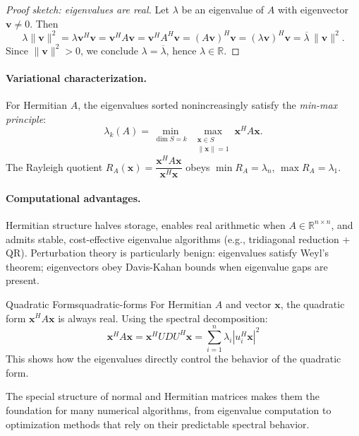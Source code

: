 \documentclass[../../main.tex]{subfiles}
\begin{document}
\begin{proof}[Proof sketch: eigenvalues are real]
    Let $\lambda$ be an eigenvalue of $A$ with eigenvector $\mathbf{v} \neq 0$. Then
    \[
        \lambda \|\mathbf{v}\|^2
        = \lambda \mathbf{v}^H \mathbf{v}
        = \mathbf{v}^H A \mathbf{v}
        = \mathbf{v}^H A^H \mathbf{v}
        = (A\mathbf{v})^H \mathbf{v}
        = (\lambda \mathbf{v})^H \mathbf{v}
        = \overline{\lambda}\, \|\mathbf{v}\|^2.
    \]
    Since $\|\mathbf{v}\|^2 > 0$, we conclude $\lambda = \overline{\lambda}$, hence $\lambda \in \mathbb{R}$.
\end{proof}

\paragraph{Variational characterization.}
For Hermitian $A$, the eigenvalues sorted nonincreasingly satisfy the \emph{min-max principle}:
\[
    \lambda_k(A)=\min_{\dim S=k}\ \max_{\substack{\mathbf{x}\in S\\ \|\mathbf{x}\|=1}} \mathbf{x}^H A \mathbf{x}.
\]
The Rayleigh quotient $R_A(\mathbf{x})=\dfrac{\mathbf{x}^H A \mathbf{x}}{\mathbf{x}^H \mathbf{x}}$ obeys $\min R_A=\lambda_n$, $\max R_A=\lambda_1$.

\paragraph{Computational advantages.}
Hermitian structure halves storage, enables real arithmetic when $A\in\mathbb{R}^{n\times n}$, and admits stable, cost-effective eigenvalue algorithms (e.g., tridiagonal reduction + QR). Perturbation theory is particularly benign: eigenvalues satisfy Weyl's theorem; eigenvectors obey Davis-Kahan bounds when eigenvalue gaps are present.

\begin{example}{Quadratic Forms}{quadratic-forms}
    For Hermitian $A$ and vector $\mathbf{x}$, the quadratic form $\mathbf{x}^H A \mathbf{x}$ is always real. Using the spectral decomposition:
    \[
        \mathbf{x}^H A \mathbf{x} = \mathbf{x}^H U D U^H \mathbf{x} = \sum_{i=1}^n \lambda_i |u_i^H \mathbf{x}|^2
    \]
    This shows how the eigenvalues directly control the behavior of the quadratic form.
\end{example}

The special structure of normal and Hermitian matrices makes them the foundation for many numerical algorithms, from eigenvalue computation to optimization methods that rely on their predictable spectral behavior.
\end{document}

